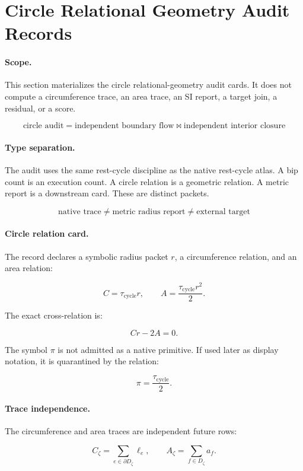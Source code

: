 \section{Circle Relational Geometry Audit Records}

\paragraph{Scope.}
This section materializes the circle relational-geometry audit cards.  It does not compute a circumference trace, an area trace, an SI report, a target join, a residual, or a score.

\[
\boxed{
\text{circle audit}=
\text{independent boundary flow}
\bowtie
\text{independent interior closure}
}
\]

\paragraph{Type separation.}
The audit uses the same rest-cycle discipline as the native rest-cycle atlas.  A bip count is an execution count.  A circle relation is a geometric relation.  A metric report is a downstream card.  These are distinct packets.

\[
\boxed{
\text{native trace}
\neq
\text{metric radius report}
\neq
\text{external target}
}
\]

\paragraph{Circle relation card.}
The record declares a symbolic radius packet $r$, a circumference relation, and an area relation:

\[
C=\tau_{\mathrm{cycle}} r,
\qquad
A=\frac{\tau_{\mathrm{cycle}} r^2}{2}.
\]

The exact cross-relation is:

\[
\boxed{Cr-2A=0.}
\]

The symbol $\pi$ is not admitted as a native primitive.  If used later as display notation, it is quarantined by the relation:

\[
\pi=\frac{\tau_{\mathrm{cycle}}}{2}.
\]

\paragraph{Trace independence.}
The circumference and area traces are independent future rows:

\[
C_\zeta=\sum_{e\in\partial D_\zeta}\ell_e,
\qquad
A_\zeta=\sum_{f\in D_\zeta}a_f.
\]

